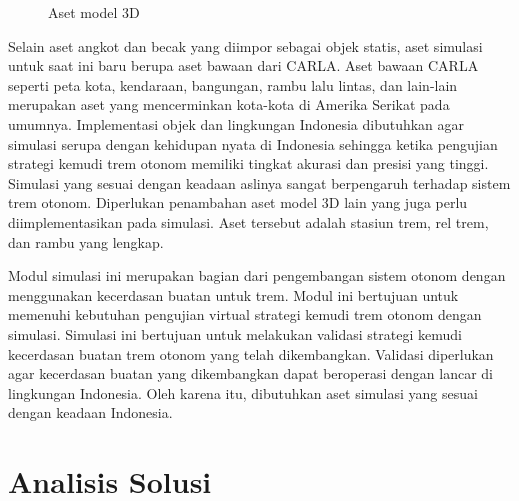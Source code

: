 \begin{figure}[ht]
	\hfill
	\hfill
	\caption{Aset model 3D \parencite{rispro-trilaksono}}
	\label{fig:3d-model-assets}
\end{figure}

Selain aset angkot dan becak yang diimpor sebagai objek statis, aset simulasi
untuk saat ini baru berupa aset bawaan dari CARLA. Aset bawaan CARLA seperti
peta kota, kendaraan, bangungan, rambu lalu lintas, dan lain-lain merupakan aset
yang mencerminkan kota-kota di Amerika Serikat pada umumnya. Implementasi objek
dan lingkungan Indonesia dibutuhkan agar simulasi serupa dengan kehidupan nyata
di Indonesia sehingga ketika pengujian strategi kemudi trem otonom memiliki
tingkat akurasi dan presisi yang tinggi. Simulasi yang sesuai dengan keadaan
aslinya sangat berpengaruh terhadap sistem trem otonom. Diperlukan penambahan
aset model 3D lain yang juga perlu diimplementasikan pada simulasi. Aset
tersebut adalah stasiun trem, rel trem, dan rambu yang lengkap.

Modul simulasi ini merupakan bagian dari pengembangan sistem otonom dengan
menggunakan kecerdasan buatan untuk trem. Modul ini bertujuan untuk memenuhi
kebutuhan pengujian virtual strategi kemudi trem otonom dengan simulasi.
Simulasi ini bertujuan untuk melakukan validasi strategi kemudi kecerdasan
buatan trem otonom yang telah dikembangkan. Validasi diperlukan agar kecerdasan
buatan yang dikembangkan dapat beroperasi dengan lancar di lingkungan Indonesia.
Oleh karena itu, dibutuhkan aset simulasi yang sesuai dengan keadaan Indonesia.

\section{Analisis Solusi}

